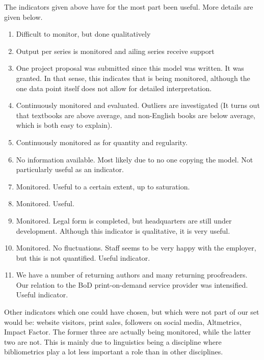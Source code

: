 \documentclass[nonflat,smallfont
]{langsci/langscibook}
\newcommand{\evaluation}[1]{
  \renewcommand{\tblslinecolour}{lsLightOrange}
  \tblssy{receipt}{Evaluation}{\vspace*{-5mm}#1}
}
\newcommand{\othersolutions}[1]{
  \renewcommand{\tblslinecolour}{lsDarkGreenOne}
  \tblssy{more}{Other solutions}{\vspace*{-5mm}#1}
}
\renewcommand{\tblssy}[4][black!12]{%
  \renewcommand{\langscisymbol}{#2}\renewcommand{\tblsboxcolor}{#1}
  \begin{mdframed}[style=yellowexercise,frametitle={#3}]
    #4
  \end{mdframed}
}
\begin{document}
\evaluation{
The indicators given above have for the most part been useful. More details are given below.
\begin{enumerate}
\item Difficult to monitor, but done qualitatively
\item Output per series is monitored and ailing series receive support
\item One project proposal was submitted since this model was written. It was granted. In that sense, this indicates that is being monitored, although the one data point itself does not allow for detailed interpretation. 
\item Continuously monitored and evaluated. Outliers are investigated (It turns out that textbooks are above average, and non-English books are below average, which is both easy to explain). 
\item Continuously monitored as for quantity and regularity. 
\item No information available. Most likely due to no one copying the model. Not particularly useful as an indicator.
\item Monitored. Useful to a certain extent, up to saturation. 
\item Monitored. Useful. 
\item Monitored. Legal form is completed, but headquarters are still under development. Although this indicator is qualitative, it is very useful. 
\item Monitored. No fluctuations. Staff seems to be very happy with the employer, but this is not quantified. Useful indicator. 
\item We have a number of returning authors and many returning proofreaders. Our relation to the BoD print-on-demand service provider was intensified. Useful indicator.
\end{enumerate}
}
\othersolutions{ 
Other indicators which one could have chosen, but which were not part of our set would be:
website visitors, print sales, followers on social media, Altmetrics, Impact Factor. The former three are actually being monitored, while the latter two are not. This is mainly due to linguistics being a discipline where bibliometrics play a lot less important a role than in other disciplines.
}

 
\clearpage
\end{document}
